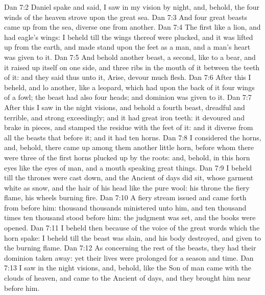 \vs Dan 7:2 Daniel spake and said, I saw in my vision by night, and, behold, the four winds of the heaven strove upon the great sea.
\vs Dan 7:3 And four great beasts came up from the sea, diverse one from another.
\vs Dan 7:4 The first  like a lion, and had eagle's wings: I beheld till the wings thereof were plucked, and it was lifted up from the earth, and made stand upon the feet as a man, and a man's heart was given to it.
\vs Dan 7:5 And behold another beast, a second, like to a bear, and it raised up itself on one side, and  three ribs in the mouth of it between the teeth of it: and they said thus unto it, Arise, devour much flesh.
\vs Dan 7:6 After this I beheld, and lo another, like a leopard, which had upon the back of it four wings of a fowl; the beast had also four heads; and dominion was given to it.
\vs Dan 7:7 After this I saw in the night visions, and behold a fourth beast, dreadful and terrible, and strong exceedingly; and it had great iron teeth: it devoured and brake in pieces, and stamped the residue with the feet of it: and it  diverse from all the beasts that  before it; and it had ten horns.
\vs Dan 7:8 I considered the horns, and, behold, there came up among them another little horn, before whom there were three of the first horns plucked up by the roots: and, behold, in this horn  eyes like the eyes of man, and a mouth speaking great things.
\vs Dan 7:9 I beheld till the thrones were cast down, and the Ancient of days did sit, whose garment  white as snow, and the hair of his head like the pure wool: his throne  the fiery flame,  his wheels  burning fire.
\vs Dan 7:10 A fiery stream issued and came forth from before him: thousand thousands ministered unto him, and ten thousand times ten thousand stood before him: the judgment was set, and the books were opened.
\vs Dan 7:11 I beheld then because of the voice of the great words which the horn spake: I beheld  till the beast was slain, and his body destroyed, and given to the burning flame.
\vs Dan 7:12 As concerning the rest of the beasts, they had their dominion taken away: yet their lives were prolonged for a season and time.
\vs Dan 7:13 I saw in the night visions, and, behold,  like the Son of man came with the clouds of heaven, and came to the Ancient of days, and they brought him near before him.
